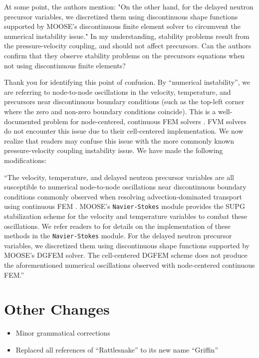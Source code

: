 \documentclass[answers,12pt]{exam}
\begin{document}
\begin{questions}
        \question At some point, the authors mention:
"On the other hand, for the delayed neutron precursor variables, we discretized them using discontinuous shape functions supported by MOOSE's discontinuous finite element solver to circumvent the numerical instability issue."
In my understanding, stability problems result from the pressure-velocity coupling, and should not affect precursors. Can the authors confirm that  they observe stability problems on the precursors equations when not using discontinuous finite elements?

        \begin{solution}
        	Thank you for identifying this point of confusion. By ``numerical
        	instability'', we are referring to node-to-node oscillations in the
        	velocity, temperature, and precursors near discontinuous
        	boundary conditions (such as the top-left corner where the zero and
        	non-zero boundary conditions coincide). This is a well-documented
        	problem for node-centered, continuous FEM solvers
        	\cite{kuhlmann_lid-driven_2018}. FVM solvers do not encounter
        	this issue due to their cell-centered implementation. We now
        	realize that readers may confuse this issue with the more commonly
        	known pressure-velocity coupling instability issue. We have made
        	the following modifications:
        	
        	``The velocity, temperature, and delayed neutron precursor variables are all susceptible to numerical node-to-node oscillations near discontinuous boundary conditions commonly observed when resolving advection-dominated transport using continuous FEM \cite{kuhlmann_lid-driven_2018}. MOOSE's \texttt{Navier-Stokes} module provides the SUPG stabilization scheme \cite{brooks_streamline_1982} for the velocity and temperature variables to combat these oscillations. We refer readers to \cite{peterson_overview_2018} for details on the implementation of these methods in the \texttt{Navier-Stokes} module. For the delayed neutron precursor variables, we discretized them using discontinuous shape functions supported by MOOSE's DGFEM solver. The cell-centered DGFEM scheme does not produce the aforementioned numerical oscillations observed with node-centered continuous FEM.''
        \end{solution}

\end{questions}

\section*{Other Changes}

\begin{itemize}
    \item Minor grammatical corrections
    \item Replaced all references of ``Rattlesnake'' to its new name
    ``Griffin''
\end{itemize}



\end{document}
